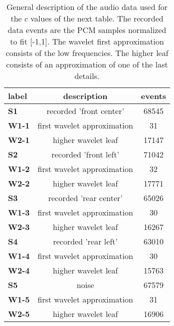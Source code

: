 \begin{table}[h!]
\begin{center}
\begin{tabular}{| l || c | c |}\hline
label & description & events \\\hline\hline
{\bf S1} & recorded 'front center' & 68545 \\\hline
{\bf W1-1} & first wavelet approximation & 31 \\\hline
{\bf W2-1} & higher wavelet leaf & 17147 \\\hline\hline
{\bf S2} & recorded 'front left' & 71042 \\\hline
{\bf W1-2} & first wavelet approximation & 32 \\\hline
{\bf W2-2} & higher wavelet leaf & 17771 \\\hline\hline
{\bf S3} & recorded 'rear center' & 65026 \\\hline
{\bf W1-3} & first wavelet approximation & 30 \\\hline
{\bf W2-3} & higher wavelet leaf & 16267 \\\hline\hline
{\bf S4} & recorded 'rear left' & 63010 \\\hline
{\bf W1-4} & first wavelet approximation & 30 \\\hline
{\bf W2-4} & higher wavelet leaf & 15763 \\\hline\hline
{\bf S5} & noise & 67579 \\\hline
{\bf W1-5} & first wavelet approximation & 31 \\\hline
{\bf W2-5} & higher wavelet leaf & 16906 \\\hline
\end{tabular}
\caption{General description of the audio data used for the $c$ values of the next table.
The recorded data events are the PCM samples normalized to fit [-1,1].
The wavelet first approximation consists of the low frequencies.
The higher leaf consists of an approximation of one of the last details.}
\end{center}
\end{table}